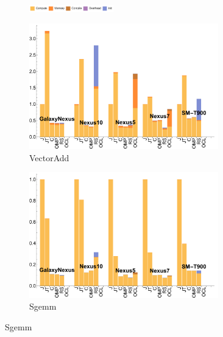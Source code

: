 \begin{figure}[t]

  \begin{subfigure}[b]{\textwidth}
          \centering
          \includegraphics[width=0.4\textwidth]{data/legend.pdf}
  \end{subfigure}

  \begin{subfigure}[b]{0.5\textwidth}
      \centering
      \includegraphics[width=0.9\textwidth]{data/VectorAdd_time.pdf}
      \caption{VectorAdd}\label{fig:vectoradd}
  \end{subfigure}
  \begin{subfigure}[b]{0.5\textwidth}
      \centering
      \includegraphics[width=0.9\textwidth]{data/Sgemm_time.pdf}
      \caption{Sgemm}\label{fig:Sgemm}
  \end{subfigure}


\end{figure}
